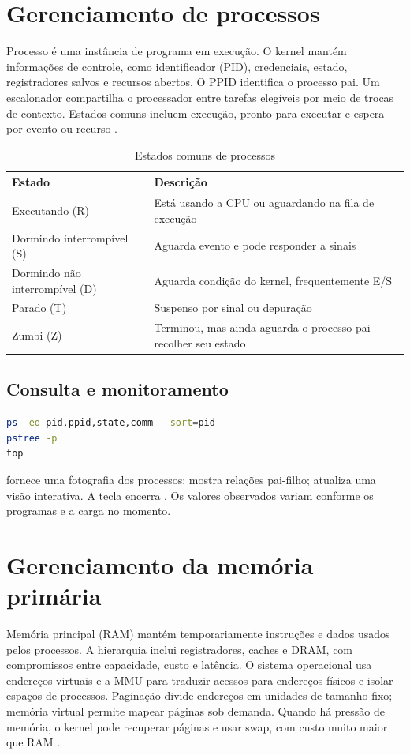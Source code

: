 \documentclass[12pt,a4paper,oneside]{article}
\newcommand{\comando}[1]{\texttt{\detokenize{#1}}}
\begin{document}
\section{Gerenciamento de processos}
Processo é uma instância de programa em execução. O kernel mantém informações de controle, como identificador (PID), credenciais, estado, registradores salvos e recursos abertos. O PPID identifica o processo pai. Um escalonador compartilha o processador entre tarefas elegíveis por meio de trocas de contexto. Estados comuns incluem execução, pronto para executar e espera por evento ou recurso \cite{silberschatz,tanenbaum}.
\begin{table}[htbp]\centering
\caption{Estados comuns de processos}\label{tab:estados-processo}
\begin{tabular}{>{\raggedright\arraybackslash}p{3cm}p{10cm}}\toprule Estado & Descrição\\\midrule
Executando (R) & Está usando a CPU ou aguardando na fila de execução\\
Dormindo interrompível (S) & Aguarda evento e pode responder a sinais\\
Dormindo não interrompível (D) & Aguarda condição do kernel, frequentemente E/S\\
Parado (T) & Suspenso por sinal ou depuração\\
Zumbi (Z) & Terminou, mas ainda aguarda o processo pai recolher seu estado\\\bottomrule\end{tabular}\end{table}
\subsection{Consulta e monitoramento}
\begin{lstlisting}[language=bash,caption={Consulta de processos e árvore de processos},label={lst:processos}]
ps -eo pid,ppid,state,comm --sort=pid
pstree -p
top
\end{lstlisting}
\comando{ps} fornece uma fotografia dos processos; \comando{pstree} mostra relações pai-filho; \comando{top} atualiza uma visão interativa. A tecla \comando{q} encerra \comando{top}. Os valores observados variam conforme os programas e a carga no momento.

\section{Gerenciamento da memória primária}
Memória principal (RAM) mantém temporariamente instruções e dados usados pelos processos. A hierarquia inclui registradores, caches e DRAM, com compromissos entre capacidade, custo e latência. O sistema operacional usa endereços virtuais e a MMU para traduzir acessos para endereços físicos e isolar espaços de processos. Paginação divide endereços em unidades de tamanho fixo; memória virtual permite mapear páginas sob demanda. Quando há pressão de memória, o kernel pode recuperar páginas e usar swap, com custo muito maior que RAM \cite{tanenbaum,arpaci}.
\end{document}
